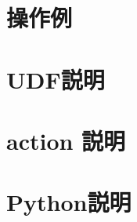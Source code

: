 \documentclass[a4paper,11pt]{jbook}
\begin{document}
 \chapter{操作例}
\chapter{UDF説明}
\chapter{action 説明}
\chapter{Python説明}
 
  
\end{document}
